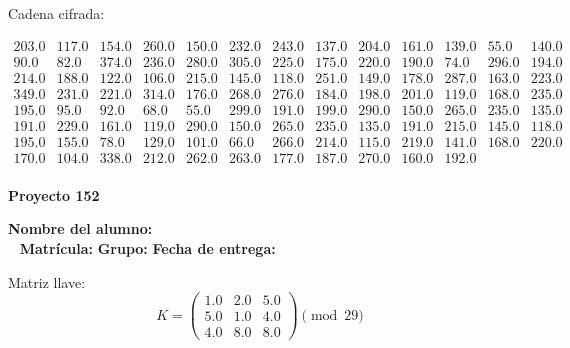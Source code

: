 \documentclass[12pt]{article}
\begin{document}
Cadena cifrada:
\begin{center}
$\begin{array}{lllllllllllll}
203.0 & 117.0 & 154.0 & 260.0 & 150.0 & 232.0 & 243.0 & 137.0 & 204.0 & 161.0 & 139.0 & 55.0 & 140.0\\
90.0 & 82.0 & 374.0 & 236.0 & 280.0 & 305.0 & 225.0 & 175.0 & 220.0 & 190.0 & 74.0 & 296.0 & 194.0\\
214.0 & 188.0 & 122.0 & 106.0 & 215.0 & 145.0 & 118.0 & 251.0 & 149.0 & 178.0 & 287.0 & 163.0 & 223.0\\
349.0 & 231.0 & 221.0 & 314.0 & 176.0 & 268.0 & 276.0 & 184.0 & 198.0 & 201.0 & 119.0 & 168.0 & 235.0\\
195.0 & 95.0 & 92.0 & 68.0 & 55.0 & 299.0 & 191.0 & 199.0 & 290.0 & 150.0 & 265.0 & 235.0 & 135.0\\
191.0 & 229.0 & 161.0 & 119.0 & 290.0 & 150.0 & 265.0 & 235.0 & 135.0 & 191.0 & 215.0 & 145.0 & 118.0\\
195.0 & 155.0 & 78.0 & 129.0 & 101.0 & 66.0 & 266.0 & 214.0 & 115.0 & 219.0 & 141.0 & 168.0 & 220.0\\
170.0 & 104.0 & 338.0 & 212.0 & 262.0 & 263.0 & 177.0 & 187.0 & 270.0 & 160.0 & 192.0\\
\end{array}$
\end{center}

\newpage


\textbf{Proyecto 152}

\textbf{Nombre del alumno:} \underline{\hspace{13cm}}\\\
\vspace{1cm}
\textbf{Matrícula:} \underline{\hspace{4cm}} \hspace{1cm}
\textbf{Grupo:} \underline{\hspace{2cm}}
\textbf{Fecha de entrega:} \underline{\hspace{2cm}}

\medskip

Matriz llave:
\[
K = \begin{pmatrix}
1.0 & 2.0 & 5.0\\
5.0 & 1.0 & 4.0\\
4.0 & 8.0 & 8.0
\end{pmatrix} \pmod{29}
\]
\end{document}
